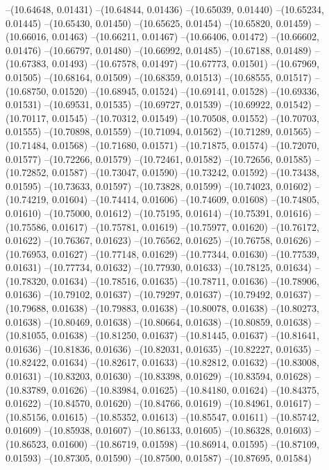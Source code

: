 --(10.64648, 0.01431)
--(10.64844, 0.01436)
--(10.65039, 0.01440)
--(10.65234, 0.01445)
--(10.65430, 0.01450)
--(10.65625, 0.01454)
--(10.65820, 0.01459)
--(10.66016, 0.01463)
--(10.66211, 0.01467)
--(10.66406, 0.01472)
--(10.66602, 0.01476)
--(10.66797, 0.01480)
--(10.66992, 0.01485)
--(10.67188, 0.01489)
--(10.67383, 0.01493)
--(10.67578, 0.01497)
--(10.67773, 0.01501)
--(10.67969, 0.01505)
--(10.68164, 0.01509)
--(10.68359, 0.01513)
--(10.68555, 0.01517)
--(10.68750, 0.01520)
--(10.68945, 0.01524)
--(10.69141, 0.01528)
--(10.69336, 0.01531)
--(10.69531, 0.01535)
--(10.69727, 0.01539)
--(10.69922, 0.01542)
--(10.70117, 0.01545)
--(10.70312, 0.01549)
--(10.70508, 0.01552)
--(10.70703, 0.01555)
--(10.70898, 0.01559)
--(10.71094, 0.01562)
--(10.71289, 0.01565)
--(10.71484, 0.01568)
--(10.71680, 0.01571)
--(10.71875, 0.01574)
--(10.72070, 0.01577)
--(10.72266, 0.01579)
--(10.72461, 0.01582)
--(10.72656, 0.01585)
--(10.72852, 0.01587)
--(10.73047, 0.01590)
--(10.73242, 0.01592)
--(10.73438, 0.01595)
--(10.73633, 0.01597)
--(10.73828, 0.01599)
--(10.74023, 0.01602)
--(10.74219, 0.01604)
--(10.74414, 0.01606)
--(10.74609, 0.01608)
--(10.74805, 0.01610)
--(10.75000, 0.01612)
--(10.75195, 0.01614)
--(10.75391, 0.01616)
--(10.75586, 0.01617)
--(10.75781, 0.01619)
--(10.75977, 0.01620)
--(10.76172, 0.01622)
--(10.76367, 0.01623)
--(10.76562, 0.01625)
--(10.76758, 0.01626)
--(10.76953, 0.01627)
--(10.77148, 0.01629)
--(10.77344, 0.01630)
--(10.77539, 0.01631)
--(10.77734, 0.01632)
--(10.77930, 0.01633)
--(10.78125, 0.01634)
--(10.78320, 0.01634)
--(10.78516, 0.01635)
--(10.78711, 0.01636)
--(10.78906, 0.01636)
--(10.79102, 0.01637)
--(10.79297, 0.01637)
--(10.79492, 0.01637)
--(10.79688, 0.01638)
--(10.79883, 0.01638)
--(10.80078, 0.01638)
--(10.80273, 0.01638)
--(10.80469, 0.01638)
--(10.80664, 0.01638)
--(10.80859, 0.01638)
--(10.81055, 0.01638)
--(10.81250, 0.01637)
--(10.81445, 0.01637)
--(10.81641, 0.01636)
--(10.81836, 0.01636)
--(10.82031, 0.01635)
--(10.82227, 0.01635)
--(10.82422, 0.01634)
--(10.82617, 0.01633)
--(10.82812, 0.01632)
--(10.83008, 0.01631)
--(10.83203, 0.01630)
--(10.83398, 0.01629)
--(10.83594, 0.01628)
--(10.83789, 0.01626)
--(10.83984, 0.01625)
--(10.84180, 0.01624)
--(10.84375, 0.01622)
--(10.84570, 0.01620)
--(10.84766, 0.01619)
--(10.84961, 0.01617)
--(10.85156, 0.01615)
--(10.85352, 0.01613)
--(10.85547, 0.01611)
--(10.85742, 0.01609)
--(10.85938, 0.01607)
--(10.86133, 0.01605)
--(10.86328, 0.01603)
--(10.86523, 0.01600)
--(10.86719, 0.01598)
--(10.86914, 0.01595)
--(10.87109, 0.01593)
--(10.87305, 0.01590)
--(10.87500, 0.01587)
--(10.87695, 0.01584)
